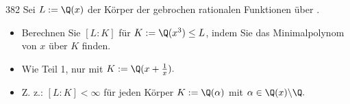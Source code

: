 \begin{algebraUE}{382}
  Sei $L := \Q(x)$ der Körper der gebrochen rationalen Funktionen über \Q.
  \begin{itemize}
      \item Berechnen Sie $[L:K]$ für $K:= \Q(x^3) \leq L$, indem Sie das Minimalpolynom von $x$ über $K$ finden.
      \item Wie Teil 1, nur mit $K := \Q(x+\frac{1}{x}).$
      \item Z. z.: $[L:K] < \infty$ für jeden Körper $K := \Q(\alpha)$ mit $\alpha \in \Q(x) \backslash \Q.$
  \end{itemize}
\end{algebraUE}

\begin{solution}

\end{solution}
